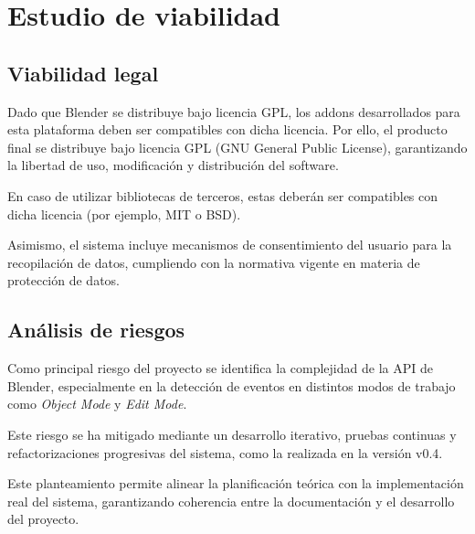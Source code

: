 \section{Estudio de viabilidad}

\subsection{Viabilidad legal}

Dado que Blender se distribuye bajo licencia GPL, los addons desarrollados para esta plataforma deben ser compatibles con dicha licencia. Por ello, el producto final se distribuye bajo licencia GPL (GNU General Public License), garantizando la libertad de uso, modificación y distribución del software.

En caso de utilizar bibliotecas de terceros, estas deberán ser compatibles con dicha licencia (por ejemplo, MIT o BSD).

Asimismo, el sistema incluye mecanismos de consentimiento del usuario para la recopilación de datos, cumpliendo con la normativa vigente en materia de protección de datos.

\subsection{Análisis de riesgos}

Como principal riesgo del proyecto se identifica la complejidad de la API de Blender, especialmente en la detección de eventos en distintos modos de trabajo como \textit{Object Mode} y \textit{Edit Mode}. 

Este riesgo se ha mitigado mediante un desarrollo iterativo, pruebas continuas y refactorizaciones progresivas del sistema, como la realizada en la versión v0.4.

Este planteamiento permite alinear la planificación teórica con la implementación real del sistema, garantizando coherencia entre la documentación y el desarrollo del proyecto.